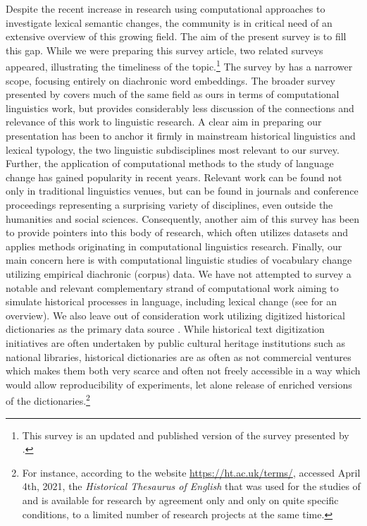 \documentclass[output=paper]{langsci/langscibook}
\begin{document}
Despite the recent increase in research using computational approaches to investigate lexical semantic changes, the community is in critical need of an extensive overview of this growing field. The aim of the present survey is to fill this gap. While we were preparing this survey article, two related surveys appeared, illustrating the timeliness of  the topic.\footnote{This survey is an updated and published version of the survey presented by \citet{tahmasebi2018survey}.} The survey by \citet{kutuzov-etal-2018-diachronic} has a narrower scope, focusing entirely on diachronic word embeddings. The broader survey presented by \citet{tang-2018} covers much of the same field as ours in terms of computational linguistics work, but provides considerably less discussion of the connections and relevance of this work to linguistic research. A clear aim in preparing our presentation has been to anchor it firmly in mainstream historical linguistics and lexical typology, the two linguistic subdisciplines most relevant to our survey. Further, the application of computational methods to the study of language change has gained popularity in recent years. Relevant work can be found not only in traditional linguistics venues, but can be found in journals and conference proceedings representing a surprising variety of disciplines, even outside the humanities and social sciences. Consequently, another aim of this survey has been to provide pointers into this body of research, which often utilizes datasets and applies methods originating in computational linguistics research. Finally, our main concern here is with computational linguistic studies of vocabulary change utilizing empirical diachronic (corpus) data. We have not attempted to survey a notable and relevant complementary strand of computational work aiming to simulate historical processes in language, including lexical change (see \citealp{baker-2008} for an overview). We also leave out of consideration work utilizing digitized historical dictionaries as the primary data source \citep[e.g.,][]{xu2017evolution,ramiro2018,cathcart-2020}. While historical text digitization initiatives are often undertaken by public cultural heritage institutions such as national libraries, historical dictionaries are as often as not commercial ventures which makes them both very scarce and often not freely accessible in a way which would allow reproducibility of experiments, let alone release of enriched versions of the dictionaries.\footnote{For instance, according to the website \url{https://ht.ac.uk/terms/}, accessed April 4th, 2021, the \emph{Historical Thesaurus of English} that was used for the studies of \citet{xu2017evolution} and \citet{ramiro2018} is available for research by agreement only and only on quite specific conditions, to a limited number of research projects at the same time.}
\end{document}
